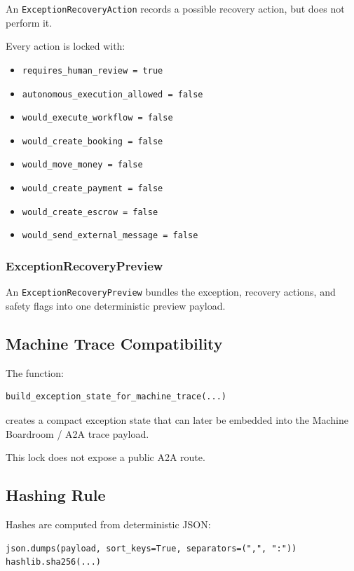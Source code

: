 An \texttt{ExceptionRecoveryAction} records a possible recovery action, but does not perform it.

Every action is locked with:

\begin{itemize}
  \item \texttt{requires\_human\_review = true}
  \item \texttt{autonomous\_execution\_allowed = false}
  \item \texttt{would\_execute\_workflow = false}
  \item \texttt{would\_create\_booking = false}
  \item \texttt{would\_move\_money = false}
  \item \texttt{would\_create\_payment = false}
  \item \texttt{would\_create\_escrow = false}
  \item \texttt{would\_send\_external\_message = false}
\end{itemize}

\subsubsection{ExceptionRecoveryPreview}

An \texttt{ExceptionRecoveryPreview} bundles the exception, recovery actions, and safety flags into one deterministic preview payload.

\subsection{Machine Trace Compatibility}

The function:

\begin{verbatim}
build_exception_state_for_machine_trace(...)
\end{verbatim}

creates a compact exception state that can later be embedded into the Machine Boardroom / A2A trace payload.

This lock does not expose a public A2A route.

\subsection{Hashing Rule}

Hashes are computed from deterministic JSON:

\begin{verbatim}
json.dumps(payload, sort_keys=True, separators=(",", ":"))
hashlib.sha256(...)
\end{verbatim}

